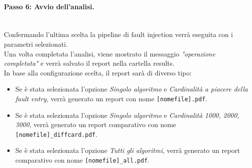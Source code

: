 \documentclass{article}
\begin{document}
\paragraph{Passo 6: Avvio dell'analisi.}\leavevmode\\
Confermando l'ultima scelta la pipeline di fault injection verrà eseguita con i parametri selezionati.\\
Una volta completata l'analisi, viene mostrato il messaggio \textit{"operazione completata"} e verrà salvato il report nella cartella results. \\
In base alla configurazione scelta, il report sarà di diverso tipo:
\begin{itemize}
    \item Se è stata selezionata l'opzione \textit{Singolo algoritmo} e \textit{Cardinalità a piacere della fault entry}, verrà generato un report con nome \texttt{[nomefile].pdf}.
    \item Se è stata selezionata l'opzione \textit{Singolo algoritmo} e \textit{Cardinalità 1000, 2000, 3000}, verrà generato un report comparativo con nome \texttt{[nomefile]\_diffcard.pdf}.
    \item Se è stata selezionata l'opzione \textit{Tutti gli algoritmi}, verrà generato un report comparativo con nome \texttt{[nomefile]\_all.pdf}.
\end{itemize}
\end{document}
